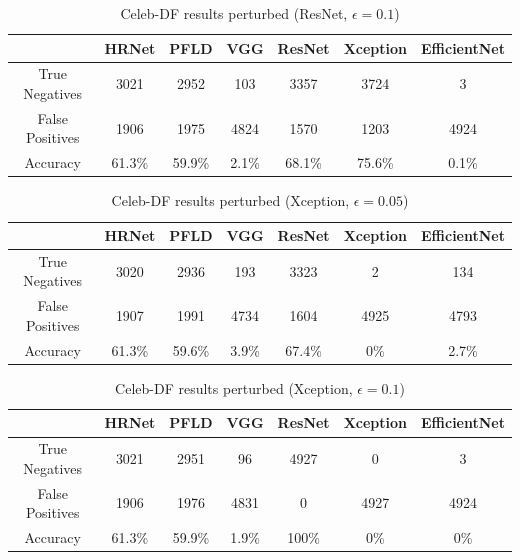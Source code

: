 \begin{table}[H]
    \centering
    \begin{tabular}{|c|c|c|c|c|c|c|}
        \hline
        \textbf{} & \textbf{HRNet} & \textbf{PFLD} &  \textbf{VGG} & \textbf{ResNet} & \textbf{Xception} & \textbf{EfficientNet} \\
        \hline
        True Negatives & 3021 & 2952 & 103 & 3357 & 3724 & 3\\
        \hline
        False Positives & 1906 & 1975 & 4824 & 1570 & 1203 & 4924\\
        \hline
        Accuracy & 61.3\% & 59.9\% & 2.1\% & 68.1\% & 75.6\% & 0.1\% \\
        \hline
    \end{tabular}
    \caption{Celeb-DF results perturbed (ResNet, $\epsilon=0.1$)}
    \label{tab:cd-res-1}
\end{table}

\begin{table}[H]
    \centering
    \begin{tabular}{|c|c|c|c|c|c|c|}
        \hline
        \textbf{} & \textbf{HRNet} & \textbf{PFLD} &  \textbf{VGG} & \textbf{ResNet} & \textbf{Xception} & \textbf{EfficientNet} \\
        \hline
        True Negatives & 3020 & 2936 & 193 & 3323 & 2 & 134\\
        \hline
        False Positives & 1907 & 1991 & 4734 & 1604 & 4925 & 4793\\
        \hline
        Accuracy & 61.3\% & 59.6\% & 3.9\% & 67.4\% & 0\% & 2.7\% \\
        \hline
    \end{tabular}
    \caption{Celeb-DF results perturbed (Xception, $\epsilon=0.05$)}
    \label{tab:cd-xce-5}
\end{table}

\begin{table}[H]
    \centering
    \begin{tabular}{|c|c|c|c|c|c|c|}
        \hline
        \textbf{} & \textbf{HRNet} & \textbf{PFLD} &  \textbf{VGG} & \textbf{ResNet} & \textbf{Xception} & \textbf{EfficientNet} \\
        \hline
        True Negatives & 3021 & 2951 & 96 & 4927 & 0 & 3\\
        \hline
        False Positives & 1906 & 1976 & 4831 & 0 & 4927 & 4924\\
        \hline
        Accuracy & 61.3\% & 59.9\% & 1.9\% & 100\% & 0\% & 0\% \\
        \hline
    \end{tabular}
    \caption{Celeb-DF results perturbed (Xception, $\epsilon=0.1$)}
    \label{tab:cd-xce-1}
\end{table}

